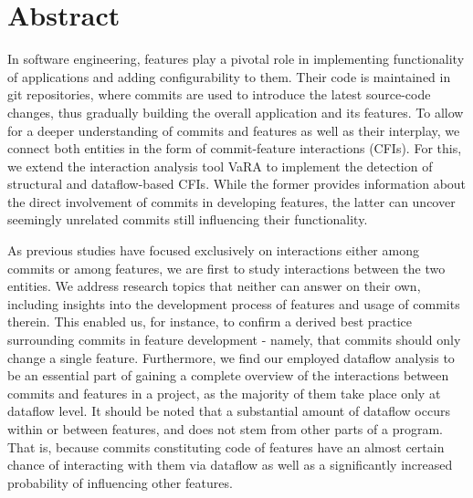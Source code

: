 \begingroup
\let\clearpage\relax
\let\cleardoublepage\relax
\let\cleardoublepage\relax

\chapter*{Abstract}

In software engineering, features play a pivotal role in implementing functionality of applications and adding configurability to them.
Their code is maintained in git repositories, where commits are used to introduce the latest source-code changes, thus gradually building the overall application and its features. %
To allow for a deeper understanding of commits and features as well as their interplay, we connect both entities in the form of commit-feature interactions (CFIs).
For this, we extend the interaction analysis tool VaRA to implement the detection of structural and dataflow-based CFIs.
While the former provides information about the direct involvement of commits in developing features, the latter can uncover seemingly unrelated commits still influencing their functionality.

As previous studies have focused exclusively on interactions either among commits or among features, we are first to study interactions between the two entities. %
We address research topics that neither can answer on their own, including insights into the development process of features and usage of commits therein. %
This enabled us, for instance, to confirm a derived best practice surrounding commits in feature development - namely, that commits should only change a single feature.
Furthermore, we find our employed dataflow analysis to be an essential part of gaining a complete overview of the interactions between commits and features in a project, as the majority of them take place only at dataflow level.
It should be noted that a substantial amount of dataflow occurs within or between features, and does not stem from other parts of a program.
That is, because commits constituting code of features have an almost certain chance of interacting with them via dataflow as well as a significantly increased probability of influencing other features. %

